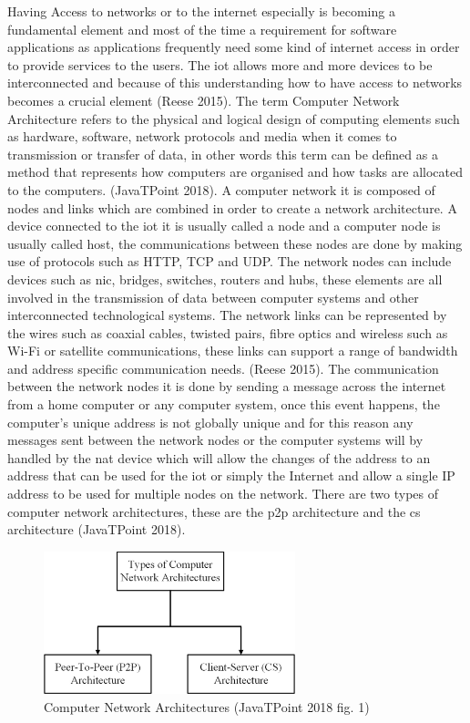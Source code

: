 Having Access to networks or to the internet especially is becoming a fundamental element and most of the time a
requirement for software applications as applications frequently need some kind of internet access in order to
provide services to the users. The \acrfull{iot} allows more and more devices to be interconnected and
because of this understanding how to have access to networks becomes a crucial element (Reese 2015).
The term Computer Network Architecture refers to the physical and logical design of computing elements such as
hardware, software, network protocols and media when it comes to transmission or transfer of data, in other words
this term can be defined as a method that represents how computers are organised and how tasks are allocated to
the computers. (JavaTPoint 2018). A computer network it is composed of nodes and links which are combined in order
to create a network architecture. A device connected to the \acrfull{iot} it is usually called a node
and a computer node is usually called host, the communications between these nodes are done by making use of
protocols such as HTTP, TCP and UDP. The network nodes can include devices such as \acrfull{nic},
bridges, switches, routers and hubs, these elements are all involved in the transmission of data between computer
systems and other interconnected technological systems. The network links can be represented by the wires such as
coaxial cables, twisted pairs, fibre optics and wireless such as Wi-Fi or satellite communications, these links
can support a range of bandwidth and address specific communication needs. (Reese 2015). The communication between
the network nodes it is done by sending a message across the internet from a home computer or any computer system,
once this event happens, the computer’s unique address is not globally unique and for this reason any messages sent
between the network nodes or the computer systems will by handled by the \acrfull{nat} device
which will allow the changes of the address to an address that can be used for the \acrfull{iot} or
simply the Internet and allow a single IP address to be used for multiple nodes on the network. There are two
types of computer network architectures, these are the \acrfull{p2p} architecture and the \acrfull{cs}
architecture (JavaTPoint 2018).

\begin{figure}[h]
    \centering
    \includegraphics[width=0.65\textwidth]{images/network-architectures.pdf}
    \captionsetup{justification=centering}
    \caption[Computer Network Architectures]{Computer Network Architectures (JavaTPoint 2018 fig. 1)}
    \label{fig:network-architectures}
\end{figure}

